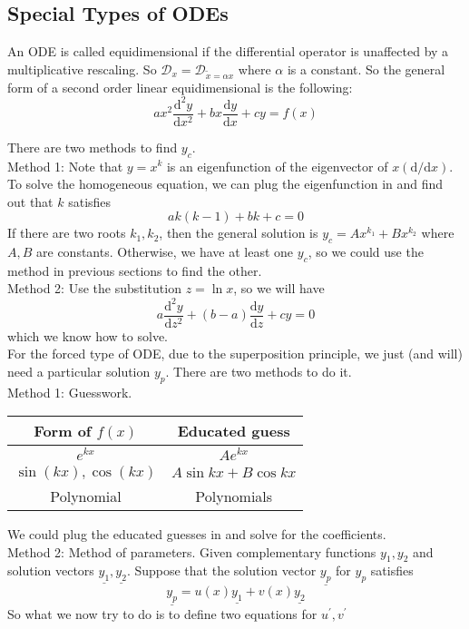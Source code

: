 \subsection{Special Types of ODEs}
\begin{definition}
    An ODE is called equidimensional if the differential operator is unaffected by a multiplicative rescaling.
    So $\mathscr{D}_x=\mathscr{D}_{\tilde{x}=\alpha x}$ where $\alpha$ is a constant.
    So the general form of a second order linear equidimensional is the following:
    $$ax^2\frac{\mathrm d^2y}{\mathrm dx^2}+bx\frac{\mathrm dy}{\mathrm dx}+cy=f(x)$$
\end{definition}
There are two methods to find $y_c$.\\
Method 1: Note that $y=x^k$ is an eigenfunction of the eigenvector of $x(\mathrm d/\mathrm dx)$.
To solve the homogeneous equation, we can plug the eigenfunction in and find out that $k$ satisfies
$$ak(k-1)+bk+c=0$$
If there are two roots $k_1,k_2$, then the general solution is $y_c=Ax^{k_1}+Bx^{k_2}$ where $A,B$ are constants.
Otherwise, we have at least one $y_c$, so we could use the method in previous sections to find the other.\\
Method 2: Use the substitution $z=\ln x$, so we will have
$$a\frac{\mathrm d^2y}{\mathrm dz^2}+(b-a)\frac{\mathrm dy}{\mathrm dz}+cy=0$$
which we know how to solve.\\
For the forced type of ODE, due to the superposition principle, we just (and will) need a particular solution $y_p$.
There are two methods to do it.\\
Method 1: Guesswork.
\begin{center}
    \begin{tabular}{c|c}
        Form of $f(x)$&Educated guess\\
        \hline
        $e^{kx}$&$Ae^{kx}$\\
        $\sin(kx),\cos(kx)$&$A\sin{kx}+B\cos{kx}$\\
        Polynomial&Polynomials
    \end{tabular}
\end{center}
We could plug the educated guesses in and solve for the coefficients.\\
Method 2: Method of parameters.
Given complementary functions $y_1,y_2$ and solution vectors $\underline{y_1},\underline{y_2}$.
Suppose that the solution vector $\underline{y_p}$ for $y_p$ satisfies
$$\underline{y_p}=u(x)\underline{y_1}+v(x)\underline{y_2}$$
So what we now try to do is to define two equations for $u^\prime,v^\prime$

